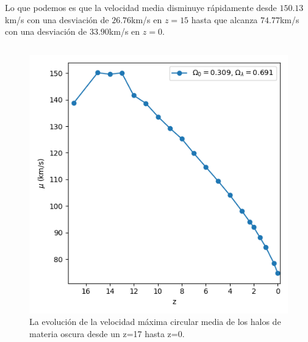 \documentclass{beamer}
\begin{document}
	\begin{frame}
		\small Lo que podemos es que la velocidad media disminuye rápidamente desde $150.13$km/s con una desviación de $26.76$km/s en $z=15$ hasta que alcanza $74.77$km/s con una desviación de $33.90$km/s en $z=0$.
		
		\begin{columns}[t]
			\begin{column}{.5\textwidth}
				\begin{figure}
					\centering
					\includegraphics[scale=0.3]{RunCanonica/VelMax_Mean_RunCanonica.png}
					\caption{\footnotesize La evolución de la velocidad máxima circular media de los halos de materia oscura desde un z=17 hasta z=0.}
					\label{fig:Canon-VelMaxMean}
				\end{figure}
			\end{column}


\end{columns}
\end{frame}
\end{document}
